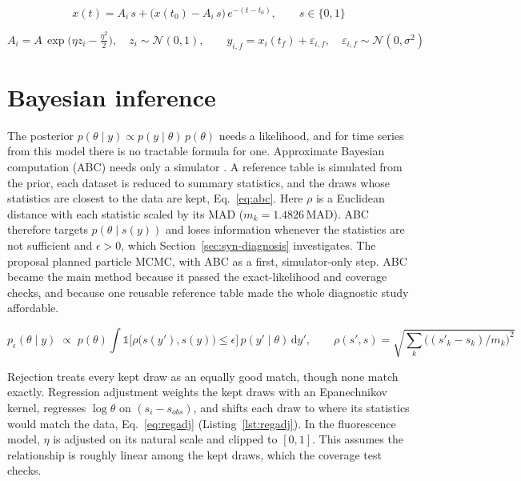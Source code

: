 \begin{equation}
x(t) = A_i\,s + \big(x(t_0) - A_i\,s\big)\, e^{-(t - t_0)}, \qquad s \in \{0, 1\}
\label{eq:relax}
\end{equation}

\begin{equation}
A_i = A\, \exp\!\Big(\eta z_i - \tfrac{\eta^2}{2}\Big),\quad z_i \sim \mathcal{N}(0,1), \qquad
y_{i,f} = x_i(t_f) + \varepsilon_{i,f},\quad \varepsilon_{i,f} \sim \mathcal{N}(0, \sigma^2)
\label{eq:extrinsic}
\end{equation}

\section{Bayesian inference}\label{sec:bayes}

The posterior $p(\theta\mid y) \propto p(y\mid\theta)\,p(\theta)$ needs a likelihood, and for time series from this model there is no tractable formula for one. Approximate Bayesian computation (ABC) needs only a simulator \cite{wilkinson2019,beaumont2002}. A reference table is simulated from the prior, each dataset is reduced to summary statistics, and the draws whose statistics are closest to the data are kept, Eq.~\eqref{eq:abc}. Here $\rho$ is a Euclidean distance with each statistic scaled by its MAD ($m_k = 1.4826\,\mathrm{MAD}$). ABC therefore targets $p(\theta\mid s(y))$ and loses information whenever the statistics are not sufficient and $\epsilon > 0$, which Section~\ref{sec:syn-diagnosis} investigates. The proposal planned particle MCMC, with ABC as a first, simulator-only step. ABC became the main method because it passed the exact-likelihood and coverage checks, and because one reusable reference table made the whole diagnostic study affordable.

\begin{equation}
p_\epsilon(\theta \mid y) \;\propto\; p(\theta) \int \mathbb{1}\big[\rho\big(s(y'), s(y)\big) \le \epsilon\big]\, p(y' \mid \theta)\, \mathrm{d}y', \qquad
\rho(s', s) = \sqrt{\textstyle\sum_{k} \big((s'_k - s_k)/m_k\big)^2}
\label{eq:abc}
\end{equation}

Rejection treats every kept draw as an equally good match, though none match exactly. Regression adjustment \cite{beaumont2002} weights the kept draws with an Epanechnikov kernel, regresses $\log\theta$ on $(s_i - s_{obs})$, and shifts each draw to where its statistics would match the data, Eq.~\eqref{eq:regadj} (Listing~\ref{lst:regadj}). In the fluorescence model, $\eta$ is adjusted on its natural scale and clipped to $[0, 1]$. This assumes the relationship is roughly linear among the kept draws, which the coverage test checks.


